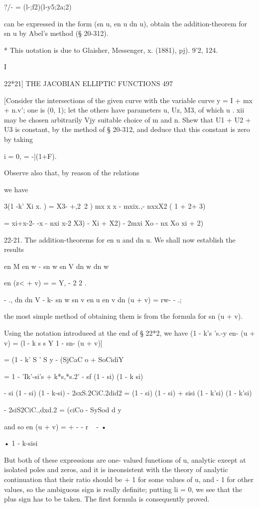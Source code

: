 ?/- = (l-;f2)(l-y5;2a;2)

can be expressed in the form (sn u, en u dn u), obtain the
addition-theorem for sn u by Abel's method (§ 20-312).

* This uotation is due to Glaisher, Messenger, x. (1881), pj). 9'2,
124.

I

22*21] THE JACOBIAN ELLIPTIC FUNCTIONS 497

[Consider the intersections of the given curve with the variable curve
y = I + mx + n.v'; one is (0, 1); let the others have parameters u,
Uz, M3, of which u . xii may be chosen arbitrarily Vjy suitable choice
of m and n. Shew that U1 + U2 + U3 is constant, by the method of §
20-312, and deduce that this constant is zero by taking

 i = 0, = -|(1+F).

Observe also that, by reason of the relations

we have

 3(1 -k' Xi x. ) = X3- +,2\ 2 ) mx x x - mxix.,- nxxX2 ( 1 + 2+ 3)

= xi+x-2- -x - nxi x-2 X3) - Xi + X2) - 2mxi Xo - nx Xo xi + 2)

22-21. The addition-theorems for en u and dn u. We shall now establish
the results

en M en w - sn w sn V dn w dn w

en (z< + v) = = Y, - 2 2 .

- ., dn dn V - k- sn w sn v en u en v dn (u + v) = rw- - .;

the most simple method of obtaining them is from the formula for sn (u
+ v).

Using the notation introdueed at the end of § 22*2, we have (1 - k's
's.-y en- (u + v) = (l - k s s Y 1 - sn- (u + v)]

= (1 - k' S ' S y - (SjCaC o + SoCidiY

= 1 - 'Ik'-si's + k*s,*s.2' - sf (1 - si) (1 - k si)

- si (1 - si) (1 - k-si) - 2sxS.2CiC.2did2 = (1 - si) (1 - si) + sisi
(1 - k'si) (1 - k'si)

- 2siS2CiC.,dxd.2 = (ciCo - SySod d y

and so en (u + v) = + - - r ~ - •

• 1 - k-sisi

But both of these expressions are one- valued funetions of u, analytic
exeept at isolated poles and zeros, and it is ineonsistent with the
theory of analytic continuation that their ratio should be + 1 for
some values of u, and - 1 for other values, so the ambiguous sign is
really definite; putting li = 0, we see that the plus sign has to be
taken. The first formula is consequently proved.

